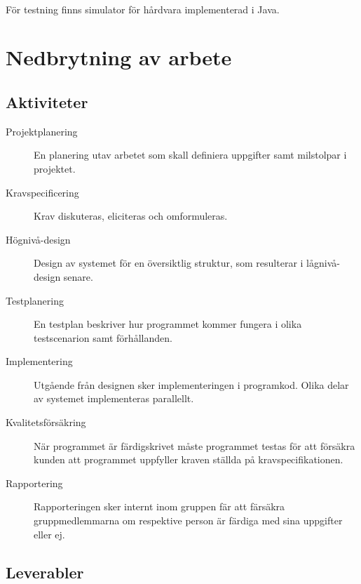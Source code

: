 \documentclass[a4paper]{article}
\begin{document}
\ \\

För testning finns simulator för hårdvara implementerad i Java.

\section{Nedbrytning av arbete} %
\subsection{Aktiviteter} %

\begin{description}
 \item[Projektplanering] En planering utav arbetet som skall definiera uppgifter samt milstolpar i projektet.
 
 \item[Kravspecificering] Krav diskuteras, eliciteras och omformuleras.

 \item[Högnivå-design] Design av systemet för en översiktlig struktur, som resulterar i lågnivå-design senare.

 \item[Testplanering] En testplan beskriver hur programmet kommer fungera i olika testscenarion samt förhållanden.
 
 \item[Implementering] Utgående från designen sker implementeringen i programkod. Olika delar av systemet implementeras parallellt.

 \item[Kvalitetsförsäkring] När programmet är färdigskrivet måste programmet testas för att försäkra kunden att programmet uppfyller kraven ställda på kravspecifikationen.
 
 \item[Rapportering] Rapporteringen sker internt inom gruppen fär att färsäkra gruppmedlemmarna om respektive person är färdiga med sina uppgifter eller ej.
\end{description}

\subsection{Leverabler} %
\end{document}
